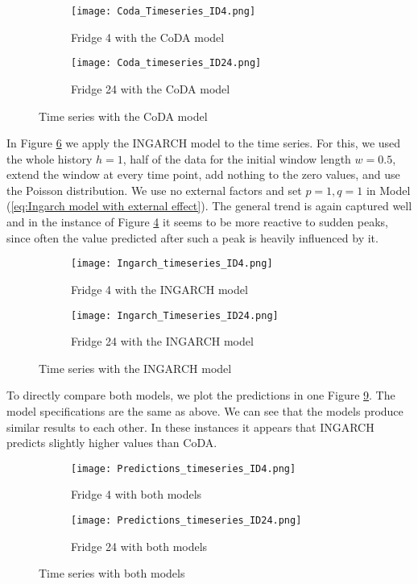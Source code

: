 \begin{figure}[htb!]
\centering
\begin{subfigure}[b]{0.45\textwidth}
\texttt{[image: Coda\_Timeseries\_ID4.png]}
\caption{Fridge 4 with the CoDA model}
\label{fig:Coda Fridge 4}
\end{subfigure}
\hfill
\begin{subfigure}[b]{0.45\textwidth}
\texttt{[image: Coda\_timeseries\_ID24.png]}
\caption{Fridge 24 with the CoDA model}
\label{fig:Coda Fridge 24}
\end{subfigure}
\caption{Time series with the CoDA model}
\label{fig:TS Coda}
\end{figure}

In Figure \ref{fig:TS Ingarch} we apply the INGARCH model to the time series. For this, we used the whole history $h=1$, half of the data for the initial window length $w=0.5$, extend the window at every time point, add nothing to the zero values, and use the Poisson distribution. We use no external factors and set $p=1, q=1$ in Model (\ref{eq:Ingarch model with external effect}). The general trend is again captured well and in the instance of Figure \ref{fig:Ingarch Fridge 4} it seems to be more reactive to sudden peaks, since often the value predicted after such a peak is heavily influenced by it.

\begin{figure}[htb]
\centering
\begin{subfigure}[b]{0.45\textwidth}
\texttt{[image: Ingarch\_timeseries\_ID4.png]}
\caption{Fridge 4 with the INGARCH model}
\label{fig:Ingarch Fridge 4}
\end{subfigure}
\hfill
\begin{subfigure}[b]{0.45\textwidth}
\texttt{[image: Ingarch\_Timeseries\_ID24.png]}
\caption{Fridge 24 with the INGARCH model}
\label{fig:Ingarch Fridge 24}
\end{subfigure}
\caption{Time series with the INGARCH model}
\label{fig:TS Ingarch}
\end{figure}


To directly compare both models, we plot the predictions in one Figure \ref{fig:TS Both}. The model specifications are the same as above. We can see that the models produce similar results to each other. In these instances it appears that INGARCH predicts slightly higher values than CoDA. 

\begin{figure}[htb!]
\centering
\begin{subfigure}[b]{0.8\textwidth}
\texttt{[image: Predictions\_timeseries\_ID4.png]}
\caption{Fridge 4 with both models}
\label{fig:Both Fridge 4}
\end{subfigure}
\hfill
\begin{subfigure}[b]{0.8\textwidth}
\texttt{[image: Predictions\_timeseries\_ID24.png]}
\caption{Fridge 24 with both models}
\label{fig:Both Fridge 24}
\end{subfigure}
\caption{Time series with both models}
\label{fig:TS Both}
\end{figure}


